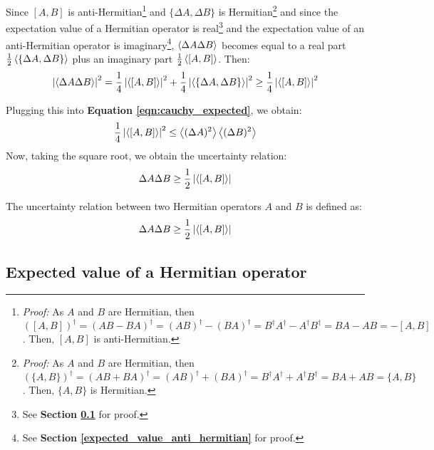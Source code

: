 Since $[A, B]$ is anti-Hermitian\footnote{\textit{Proof:} As $A$ and $B$ are Hermitian, then $([A, B])^\dagger = (AB - BA)^\dagger = (AB)^\dagger - (BA)^\dagger = B^\dagger A^\dagger - A^\dagger B^\dagger = BA - AB = -[A, B]$. Then, $[A, B]$ is anti-Hermitian.} and $\{\Delta A, \Delta B\}$ is Hermitian\footnote{\textit{Proof:} As $A$ and $B$ are Hermitian, then $(\{A, B\})^\dagger = (AB + BA)^\dagger = (AB)^\dagger + (BA)^\dagger = B^\dagger A^\dagger + A^\dagger B^\dagger = BA + AB = \{A, B\}$. Then, $\{A, B\}$ is Hermitian.} and since the expectation value of a Hermitian operator is real\footnote{See \textbf{Section     \ref{expected_value_hermitian}} for proof.} and the expectation value of an anti-Hermitian operator is imaginary\footnote{See \textbf{Section     \ref{expected_value_anti_hermitian}} for proof.}, $\left\langle\Delta A \Delta B\right\rangle$ becomes equal to a real part $\frac12\left\langle\{\Delta A, \Delta B\}\right\rangle$ plus an imaginary part $\frac12\left\langle[A,B]\right\rangle$. Then:
\begin{equation}
    \left|\left\langle\Delta A \Delta B\right\rangle\right|^2 = \frac14 \left|\left\langle[A, B]\right\rangle\right|^2 + \frac14 \left|\left\langle\{\Delta A , \Delta B\}\right\rangle\right|^2 \geq \frac14 \left|\left\langle[A, B]\right\rangle\right|^2
\end{equation}

Plugging this into \textbf{Equation \ref{eqn:cauchy_expected}}, we obtain:
\begin{equation}
    \frac14 \left|\left\langle[A, B]\right\rangle\right|^2 \leq \left\langle(\Delta A)^2\right\rangle\left\langle(\Delta B)^2\right\rangle
\end{equation}
Now, taking the square root, we obtain the uncertainty relation:
\begin{equation}
    \Delta A\Delta B \geq \frac12 \left|\left\langle[A, B]\right\rangle\right|
\end{equation}

\begin{definition}
    The uncertainty relation between two Hermitian operators $A$ and $B$ is defined as:
    \begin{equation}
        \Delta A\Delta B \geq \frac12 \left|\left\langle[A, B]\right\rangle\right|
    \end{equation}
\end{definition}

\subsection{Expected value of a Hermitian operator} \label{expected_value_hermitian}

